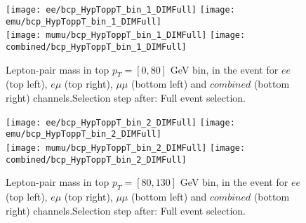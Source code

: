 \documentclass[12pt, a4paper, titlepage]{article}
\begin{document}
% 
% 

\begin{figure}
  \texttt{[image: ee/bcp\_HypToppT\_bin\_1\_DIMFull]}
  \texttt{[image: emu/bcp\_HypToppT\_bin\_1\_DIMFull]}\\
  \texttt{[image: mumu/bcp\_HypToppT\_bin\_1\_DIMFull]}
  \texttt{[image: combined/bcp\_HypToppT\_bin\_1\_DIMFull]}
\caption{Lepton-pair mass in top $p_T = [0,80]$ GeV bin, in the event for $ee$ (top left), $e\mu$ (top right), $\mu\mu$ (bottom left) and $combined$ (bottom right) channels.\newline Selection step after: Full event selection.}
\end{figure}

\clearpage
\newpage


\begin{figure}
  \texttt{[image: ee/bcp\_HypToppT\_bin\_2\_DIMFull]}
  \texttt{[image: emu/bcp\_HypToppT\_bin\_2\_DIMFull]}\\
  \texttt{[image: mumu/bcp\_HypToppT\_bin\_2\_DIMFull]}
  \texttt{[image: combined/bcp\_HypToppT\_bin\_2\_DIMFull]}
\caption{Lepton-pair mass in top $p_T = [80,130]$ GeV bin, in the event for $ee$ (top left), $e\mu$ (top right), $\mu\mu$ (bottom left) and $combined$ (bottom right) channels.\newline Selection step after: Full event selection.}
\end{figure}
\end{document}
